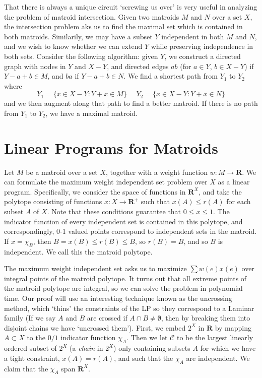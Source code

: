 That there is always a unique circuit `screwing us over' is very useful in analyzing the problem of matroid intersection. Given two matroids $M$ and $N$ over a set $X$, the intersection problem aks us to find the maximal set which is contained in both matroids. Similarily, we may have a subset $Y$ independent in both $M$ and $N$, and we wish to know whether we can extend $Y$ while preserving independence in both sets. Consider the following algorithm: given $Y$, we construct a directed graph with nodes in $Y$ and $X - Y$, and directed edges $ab$ (for $a \in Y$, $b \in X - Y$) if $Y - a + b \in M$, and $ba$ if $Y - a + b \in N$. We find a shortest path from $Y_1$ to $Y_2$ where
%
\[ Y_1 = \{ x \in X - Y : Y + x \in M \}\ \ \ \ \ \ Y_2 = \{ x \in X - Y: Y + x \in N \} \]
%
and we then augment along that path to find a better matroid. If there is no path from $Y_1$ to $Y_2$, we have a maximal matroid.

\section{Linear Programs for Matroids}

Let $M$ be a matroid over a set $X$, together with a weight function $w: M \to \mathbf{R}$. We can formulate the maximum weight independent set problem over $X$ as a linear program. Specifically, we consider the space of functions in $\mathbf{R}^X$, and take the polytope consisting of functions $x: X \to \mathbf{R}^+$ such that $x(A) \leq r(A)$ for each subset $A$ of $X$. Note that these conditions guarantee that $0 \leq x \leq 1$. The indicator function of every independent set is contained in this polytope, and correspondingly, 0-1 valued points correspond to independent sets in the matroid. If $x = \chi_B$, then $B = x(B) \leq r(B) \leq B$, so $r(B) = B$, and so $B$ is independent. We call this the matroid polytope.

The maximum weight independent set asks us to maximize $\sum w(e) x(e)$ over integral points of the matroid polytope. It turns out that all extreme points of the matroid polytope are integral, so we can solve the problem in polynomial time. Our proof will use an interesting technique known as the uncrossing method, which `thins' the constraints of the LP so they correspond to a Laminar family (If we say $A$ and $B$ are crossed if $A \cap B \neq \emptyset$, then by breaking them into disjoint chains we have `uncrossed them'). First, we embed $2^X$ in $\mathbf{R}$ by mapping $A \subset X$ to the $0/1$ indicator function $\chi_A$. Then we let $\mathcal{C}$ to be the largest linearly ordered subset of $2^X$ (a {\it chain} in $2^X$) only containing subsets $A$ for which we have a tight constraint, $x(A) = r(A)$, and such that the $\chi_A$ are independent. We claim that the $\chi_A$ span $\mathbf{R}^X$.

